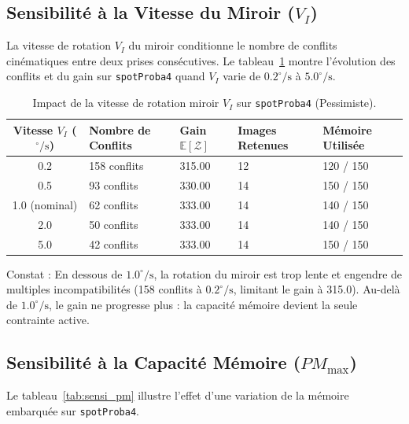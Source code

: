 \subsection{Sensibilité à la Vitesse du Miroir \texorpdfstring{($V_I$)}{(VI)}}
La vitesse de rotation $V_I$ du miroir conditionne le nombre de conflits cinématiques entre deux prises consécutives. Le tableau~\ref{tab:sensi_vi} montre l'évolution des conflits et du gain sur \texttt{spotProba4} quand $V_I$ varie de $0.2^\circ/\text{s}$ à $5.0^\circ/\text{s}$.

\begin{table}[H]
\centering
\small
\begin{tabularx}{\textwidth}{cXXXX}
\toprule
\textbf{Vitesse $V_I$ ($^\circ/\text{s}$)} & \textbf{Nombre de Conflits} & \textbf{Gain $\mathbb{E}[\mathcal{Z}]$} & \textbf{Images Retenues} & \textbf{Mémoire Utilisée} \\
\midrule
0.2 & 158 conflits & 315.00 & 12 & 120 / 150 \\
0.5 & 93 conflits & 330.00 & 14 & 150 / 150 \\
1.0 (nominal) & 62 conflits & 333.00 & 14 & 140 / 150 \\
2.0 & 50 conflits & 333.00 & 14 & 140 / 150 \\
5.0 & 42 conflits & 333.00 & 14 & 150 / 150 \\
\bottomrule
\end{tabularx}
\caption{Impact de la vitesse de rotation miroir $V_I$ sur \texttt{spotProba4} (Pessimiste).}
\label{tab:sensi_vi}
\end{table}

Constat : En dessous de $1.0^\circ/\text{s}$, la rotation du miroir est trop lente et engendre de multiples incompatibilités (158 conflits à $0.2^\circ/\text{s}$, limitant le gain à 315.0). Au-delà de $1.0^\circ/\text{s}$, le gain ne progresse plus : la capacité mémoire devient la seule contrainte active.

\subsection{Sensibilité à la Capacité Mémoire \texorpdfstring{($PM_{\max}$)}{(PMmax)}}
Le tableau~\ref{tab:sensi_pm} illustre l'effet d'une variation de la mémoire embarquée sur \texttt{spotProba4}.

